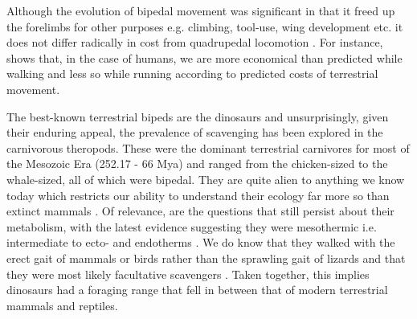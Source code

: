 \documentclass[a4paper,12pt]{article}
\begin{document}
Although the evolution of bipedal movement was significant in that it freed up the forelimbs for other purposes e.g. climbing, tool-use, wing development etc. it does not differ radically in cost from quadrupedal locomotion \citep[and references therein]{williams1999evolution}. 
For instance, \cite{alexander2004bipedal} shows that, in the case of humans, we are more economical than predicted while walking and less so while running according to predicted costs of terrestrial movement. 

The best-known terrestrial bipeds are the dinosaurs and unsurprisingly, given their enduring appeal, the prevalence of scavenging has been explored in the carnivorous theropods.
These were the dominant terrestrial carnivores for most of the Mesozoic Era (252.17 - 66 Mya) and ranged from the chicken-sized to the whale-sized, all of which were bipedal.
They are quite alien to anything we know today which restricts our ability to understand their ecology far more so than extinct mammals \citep{weishampel2004dinosauria}.
Of relevance, are the questions that still persist about their metabolism, with the latest evidence suggesting they were mesothermic i.e. intermediate to ecto- and endotherms \citep{grady2014evidence}. 
We do know that they walked with the erect gait of mammals or birds rather than the sprawling gait of lizards and that they were most likely facultative scavengers \citep{weishampel2004dinosauria,depalma2013physical}. %
Taken together, this implies dinosaurs had a foraging range that fell in between that of modern terrestrial mammals and reptiles. 


\end{document}
